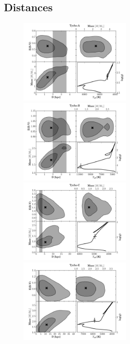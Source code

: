 \subsection{Distances}
\label{sec:distance}
\begin{figure}[tb] %
   \includegraphics[width=0.5\textwidth]{chapter_sn1572_hires/plots/tycho-a-panel.pdf} 
   \includegraphics[width=0.5\textwidth]{chapter_sn1572_hires/plots/tycho-b-panel.pdf} 
   \includegraphics[width=0.5\textwidth]{chapter_sn1572_hires/plots/tycho-c-panel.pdf} 
   \includegraphics[width=0.5\textwidth]{chapter_sn1572_hires/plots/tycho-e-panel.pdf} 

\end{figure}
